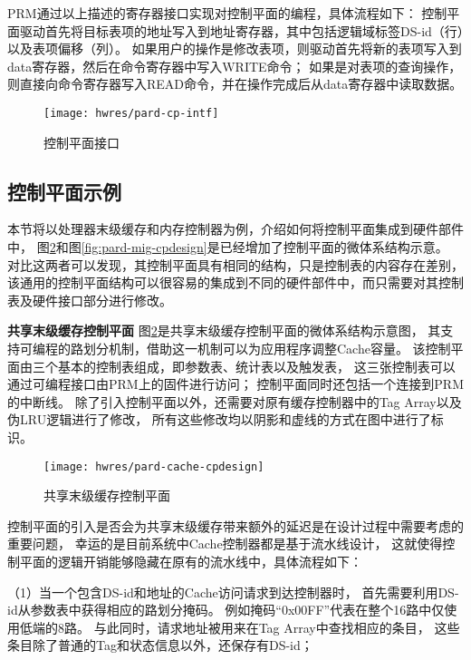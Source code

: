 PRM通过以上描述的寄存器接口实现对控制平面的编程，具体流程如下：
控制平面驱动首先将目标表项的地址写入到地址寄存器，其中包括逻辑域标签DS-id（行）以及表项偏移（列）。
如果用户的操作是修改表项，则驱动首先将新的表项写入到data寄存器，然后在命令寄存器中写入WRITE命令；
如果是对表项的查询操作，则直接向命令寄存器写入READ命令，并在操作完成后从data寄存器中读取数据。

\begin{figure}[tb]
  \centering
  \texttt{[image: hwres/pard-cp-intf]}
  \caption[控制平面接口]{控制平面接口}
  \label{fig:pard-cp-intf}
\end{figure}


\subsection{控制平面示例}

本节将以处理器末级缓存和内存控制器为例，介绍如何将控制平面集成到硬件部件中，
图\ref{fig:pard-cache-cpdesign}和图\ref{fig:pard-mig-cpdesign}是已经增加了控制平面的微体系结构示意。
对比这两者可以发现，其控制平面具有相同的结构，只是控制表的内容存在差别，
该通用的控制平面结构可以很容易的集成到不同的硬件部件中，而只需要对其控制表及硬件接口部分进行修改。

\textbf{共享末级缓存控制平面}\quad
图\ref{fig:pard-cache-cpdesign}是共享末级缓存控制平面的微体系结构示意图，
其支持可编程的路划分机制，借助这一机制可以为应用程序调整Cache容量。
该控制平面由三个基本的控制表组成，即参数表、统计表以及触发表，
这三张控制表可以通过可编程接口由PRM上的固件进行访问；
控制平面同时还包括一个连接到PRM的中断线。
除了引入控制平面以外，还需要对原有缓存控制器中的Tag Array以及伪LRU逻辑进行了修改，
所有这些修改均以阴影和虚线的方式在图中进行了标识。

\begin{figure}[tb]
  \centering
  \texttt{[image: hwres/pard-cache-cpdesign]}
  \caption{共享末级缓存控制平面}
  \label{fig:pard-cache-cpdesign}
\end{figure}

控制平面的引入是否会为共享末级缓存带来额外的延迟是在设计过程中需要考虑的重要问题，
幸运的是目前系统中Cache控制器都是基于流水线设计，
这就使得控制平面的逻辑开销能够隐藏在原有的流水线中，具体流程如下：

（1）当一个包含DS-id和地址的Cache访问请求到达控制器时，
首先需要利用DS-id从参数表中获得相应的路划分掩码。
例如掩码``0x00FF''代表在整个16路中仅使用低端的8路。
与此同时，请求地址被用来在Tag Array中查找相应的条目，
这些条目除了普通的Tag和状态信息以外，还保存有DS-id；

